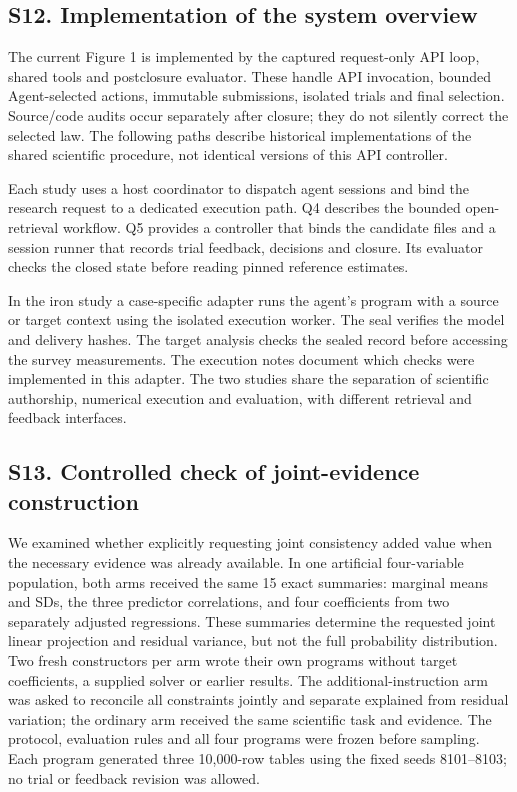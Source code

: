 \documentclass[11pt,letterpaper]{article}
\begin{document}
\subsection*{S12. Implementation of the system overview}

The current Figure 1 is implemented by the captured request-only API loop, shared tools and postclosure evaluator. These handle API invocation, bounded Agent-selected actions, immutable submissions, isolated trials and final selection. Source/\allowbreak{}code audits occur separately after closure; they do not silently correct the selected law. The following paths describe historical implementations of the shared scientific procedure, not identical versions of this API controller.


Each study uses a host coordinator to dispatch agent sessions and bind the research request to a dedicated execution path. Q4 describes the bounded open-retrieval workflow. Q5 provides a controller that binds the candidate files and a session runner that records trial feedback, decisions and closure. Its evaluator checks the closed state before reading pinned reference estimates.


In the iron study a case-specific adapter runs the agent's program with a source or target context using the isolated execution worker. The seal verifies the model and delivery hashes. The target analysis checks the sealed record before accessing the survey measurements. The execution notes document which checks were implemented in this adapter. The two studies share the separation of scientific authorship, numerical execution and evaluation, with different retrieval and feedback interfaces.


\clearpage

\subsection*{S13. Controlled check of joint-evidence construction}

We examined whether explicitly requesting joint consistency added value when the necessary evidence was already available. In one artificial four-variable population, both arms received the same 15 exact summaries: marginal means and SDs, the three predictor correlations, and four coefficients from two separately adjusted regressions. These summaries determine the requested joint linear projection and residual variance, but not the full probability distribution. Two fresh constructors per arm wrote their own programs without target coefficients, a supplied solver or earlier results. The additional-instruction arm was asked to reconcile all constraints jointly and separate explained from residual variation; the ordinary arm received the same scientific task and evidence. The protocol, evaluation rules and all four programs were frozen before sampling. Each program generated three 10,000-row tables using the fixed seeds 8101–\allowbreak{}8103; no trial or feedback revision was allowed.
\end{document}
